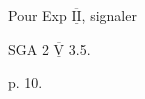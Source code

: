Pour Exp $\overline{\underline{\mathrm{II}}}$,  signaler

SGA 2 \quad $\overline{\underline{\mathrm{V}}}$ 3.5.

p. 10.

